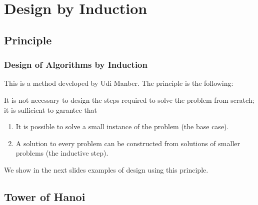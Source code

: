 \documentclass{beamer}
\begin{document}
\fi

\section{Design by Induction}

\subsection{Principle}

\begin{frame}[containsverbatim]
\frametitle{Design of Algorithms by Induction}

This is a method developed by Udi Manber. The principle is the following:

\begin{mdframed}[style=exampledefault]
It is not necessary to design the steps required to solve the problem from scratch;
it is sufficient to garantee that
\begin{enumerate}
\item It is possible to solve a small instance of the problem (the base case).

\item A solution to every problem can be constructed from solutions of smaller
problems (the inductive step).
\end{enumerate}

\end{mdframed}
\vspace{0.4cm}
We show in the next slides examples of design using this principle.

\end{frame}

\subsection{Tower of Hanoi}
\end{document}
